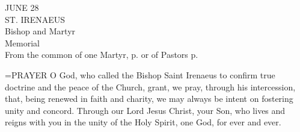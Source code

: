 \begin{center}\normalsize JUNE 28\\
\footnotesize ST. IRENAEUS\\
\footnotesize Bishop and Martyr\\
\footnotesize Memorial\\
\footnotesize From the common of one Martyr, p.    or of Pastors p. \\
\end{center}

\hangindent=\parindent \small{PRAYER 
O God, who called the Bishop Saint Irenaeus
to confirm true doctrine and the peace of the Church,
grant, we pray, through his intercession,
that, being renewed in faith and charity,
we may always be intent on fostering unity and concord.
Through our Lord Jesus Christ, your Son,
who lives and reigns with you in the unity of the Holy Spirit,
one God, for ever and ever.\\}
 

